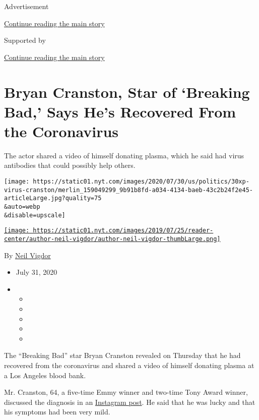 Advertisement

\protect\hyperlink{after-top}{Continue reading the main story}

Supported by

\protect\hyperlink{after-sponsor}{Continue reading the main story}

\hypertarget{bryan-cranston-star-of-breaking-bad-says-hes-recovered-from-the-coronavirus}{%
\section{Bryan Cranston, Star of `Breaking Bad,' Says He's Recovered
From the
Coronavirus}\label{bryan-cranston-star-of-breaking-bad-says-hes-recovered-from-the-coronavirus}}

The actor shared a video of himself donating plasma, which he said had
virus antibodies that could possibly help others.

\texttt{[image: https://static01.nyt.com/images/2020/07/30/us/politics/30xp-virus-cranston/merlin\_159049299\_9b91b8fd-a034-4134-baeb-43c2b24f2e45-articleLarge.jpg?quality=75\\\&auto=webp\\\&disable=upscale]}

\href{https://www.nytimes.com/by/neil-vigdor}{\texttt{[image: https://static01.nyt.com/images/2019/07/25/reader-center/author-neil-vigdor/author-neil-vigdor-thumbLarge.png]}}

By \href{https://www.nytimes.com/by/neil-vigdor}{Neil Vigdor}

\begin{itemize}
\item
  July 31, 2020
\item
  \begin{itemize}
  \item
  \item
  \item
  \item
  \item
  \end{itemize}
\end{itemize}

The ``Breaking Bad'' star Bryan Cranston revealed on Thursday that he
had recovered from the coronavirus and shared a video of himself
donating plasma at a Los Angeles blood bank.

Mr. Cranston, 64, a five-time Emmy winner and two-time Tony Award
winner, discussed the diagnosis in an
\href{https://www.instagram.com/tv/CDReUi1pcDm/?utm_source=ig_web_copy_link}{Instagram
post}. He said that he was lucky and that his symptoms had been very
mild.

